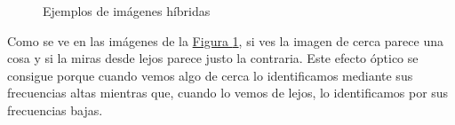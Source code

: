 \documentclass[11pt,a4paper]{article}
\theoremstyle{plain}
\theoremstyle{definition}
\begin{document}
\begin{figure}[!h]
    \centering
    \caption{Ejemplos de imágenes híbridas}
    \label{hybrid}
\end{figure}

Como se ve en las imágenes de la \hyperref[hybrid]{Figura \ref*{hybrid}}, si ves la imagen de cerca parece una cosa y si la miras desde lejos parece justo la contraria. Este efecto óptico se consigue porque cuando vemos algo de cerca lo identificamos mediante sus frecuencias altas mientras que, cuando lo vemos de lejos, lo identificamos por sus frecuencias bajas.
\end{document}
